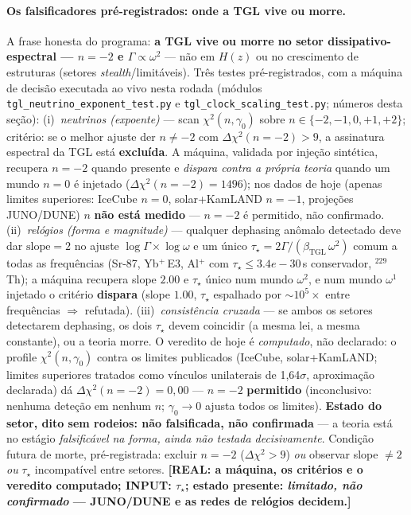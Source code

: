 \documentclass[12pt,a4paper]{article}
\newcommand{\betatgl}{\beta_{\text{TGL}}}
\newcommand{\TGL}{\textsc{TGL}}
\begin{document}
\paragraph{Os falsificadores pr\'e-registrados: onde a \TGL{} vive ou morre.}
A frase honesta do programa: \textbf{a \TGL{} vive ou morre no setor dissipativo-espectral --- $n=-2$ e $\Gamma\propto\omega^2$} --- n\~ao em $H(z)$ ou no crescimento de estruturas (setores \emph{stealth}/limit\'aveis).  Tr\^es testes pr\'e-registrados, com a m\'aquina de decis\~ao executada ao vivo nesta rodada (m\'odulos \texttt{tgl\_neutrino\_exponent\_test.py} e \texttt{tgl\_clock\_scaling\_test.py}; n\'umeros desta se\c{c}\~ao):  (i)~\emph{neutrinos (expoente)} --- scan $\chi^2(n,\gamma_0)$ sobre $n\in\{-2,-1,0,+1,+2\}$; crit\'erio: se o melhor ajuste der $n\neq-2$ com $\Delta\chi^2(n{=}-2)>9$, a assinatura espectral da \TGL{} est\'a \textbf{exclu\'ida}.  A m\'aquina, validada por inje\c{c}\~ao sint\'etica, recupera $n=-2$ quando presente e \emph{dispara contra a pr\'opria teoria} quando um mundo $n=0$ \'e injetado ($\Delta\chi^2(n{=}-2)=1496$); nos dados de hoje (apenas limites superiores: IceCube $n{=}0$, solar+KamLAND $n{=}-1$, proje\c{c}\~oes JUNO/DUNE) $n$ \textbf{n\~ao est\'a medido} --- $n=-2$ \'e permitido, n\~ao confirmado.  (ii)~\emph{rel\'ogios (forma e magnitude)} --- qualquer dephasing an\^omalo detectado deve dar $\mathrm{slope}=2$ no ajuste $\log\Gamma\times\log\omega$ e um \'unico $\tau_\star=2\Gamma/(\betatgl\,\omega^2)$ comum a todas as frequ\^encias (Sr-87, Yb$^+$\,E3, Al$^+$ com $\tau_\star\le3.4e-30$\,s conservador, $^{229}$Th); a m\'aquina recupera slope $2.00$ e $\tau_\star$ \'unico num mundo $\omega^2$, e num mundo $\omega^1$ injetado o crit\'erio \textbf{dispara} (slope $1.00$, $\tau_\star$ espalhado por $\sim10^{5}\times$ entre frequ\^encias $\Rightarrow$ refutada).  (iii)~\emph{consist\^encia cruzada} --- se ambos os setores detectarem dephasing, os dois $\tau_\star$ devem coincidir (a mesma lei, a mesma constante), ou a teoria morre.  O veredito de hoje \'e \emph{computado}, n\~ao declarado: o profile $\chi^2(n,\gamma_0)$ contra os limites publicados (IceCube, solar+KamLAND; limites superiores tratados como v\'inculos unilaterais de 1{,}64$\sigma$, aproxima\c{c}\~ao declarada) d\'a $\Delta\chi^2(n{=}-2)=0{,}00$ --- $n=-2$ \textbf{permitido} (inconclusivo: nenhuma dete\c{c}\~ao em nenhum $n$; $\gamma_0\to0$ ajusta todos os limites).  \textbf{Estado do setor, dito sem rodeios: n\~ao falsificada, n\~ao confirmada} --- a teoria est\'a no est\'agio \emph{falsific\'avel na forma, ainda n\~ao testada decisivamente}.  Condi\c{c}\~ao futura de morte, pr\'e-registrada: excluir $n=-2$ ($\Delta\chi^2>9$) \emph{ou} observar slope $\neq2$ \emph{ou} $\tau_\star$ incompat\'ivel entre setores.  \textbf{[REAL: a m\'aquina, os crit\'erios e o veredito computado; INPUT: $\tau_\star$; estado presente: \emph{limitado, n\~ao confirmado} --- JUNO/DUNE e as redes de rel\'ogios decidem.]}
\end{document}
